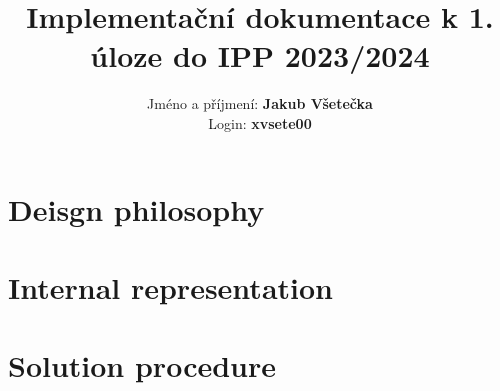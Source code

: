 \documentclass[10pt,a4paper]{article}
\title{Implementační dokumentace k \textbf{1}. úloze do IPP 2023/2024}
\author{Jméno a příjmení: \textbf{Jakub Všetečka} \\ Login: \textbf{xvsete00}}
\date{}
\begin{document}
\maketitle

\section{Deisgn philosophy}


\section{Internal representation}

\section{Solution procedure}

\end{document}
